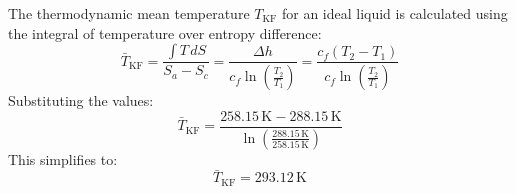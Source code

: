 The thermodynamic mean temperature \( T_{\text{KF}} \) for an ideal liquid is calculated using the integral of temperature over entropy difference:  
\[
\bar{T}_{\text{KF}} = \frac{\int T \, dS}{S_a - S_c} = \frac{\Delta h}{c_f \ln \left( \frac{T_2}{T_1} \right)} = \frac{c_f (T_2 - T_1)}{c_f \ln \left( \frac{T_2}{T_1} \right)}
\]  
Substituting the values:  
\[
\bar{T}_{\text{KF}} = \frac{258.15 \, \text{K} - 288.15 \, \text{K}}{\ln \left( \frac{288.15 \, \text{K}}{258.15 \, \text{K}} \right)}
\]  
This simplifies to:  
\[
\bar{T}_{\text{KF}} = 293.12 \, \text{K}
\]